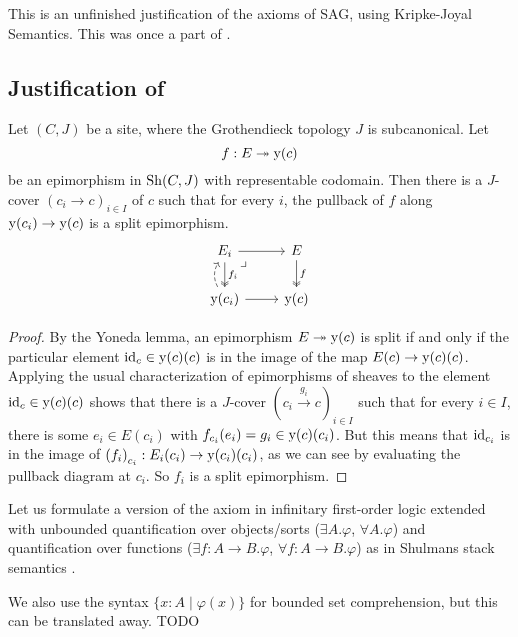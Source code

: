 This is an unfinished justification of the axioms of SAG,
using Kripke-Joyal Semantics. This was once a part of \cite{draft}.

\subsection{Justification of }

\begin{lemma}
  Let $(C, J)$ be a site,
  where the Grothendieck topology $J$ is subcanonical.
  Let
  \[ f : E \twoheadrightarrow \mathrm{y}(c) \]
  be an epimorphism in $\mathrm{Sh}(C, J)$ with representable codomain.
  Then there is a $J$-cover $(c_i \to c)_{i \in I}$ of $c$
  such that for every $i$,
  the pullback of $f$ along $\mathrm{y}(c_i) \to \mathrm{y}(c)$
  is a split epimorphism.
  \[ \begin{tikzcd}
    E_i \ar[r] \ar[d, two heads, "f_i"] \ar[dr, phantom, very near start, "\lrcorner"] &
    E \ar[d, two heads, "f"] \\
    \yo(c_i) \ar[r] \ar[u, bend left, dashed]&
    \yo(c)
  \end{tikzcd} \]
\end{lemma}

\begin{proof}
  By the Yoneda lemma,
  an epimorphism $E \twoheadrightarrow \mathrm{y}(c)$ is split
  if and only if
  the particular element $\mathrm{id}_c \in \mathrm{y}(c)(c)$
  is in the image of the map $E(c) \to \mathrm{y}(c)(c)$.
  Applying the usual characterization of epimorphisms of sheaves
  \cite[Corollary III.7.5]{maclane-moerdjik}
  to the element $\mathrm{id}_c \in \mathrm{y}(c)(c)$
  shows that there is a $J$-cover ${(c_i \xrightarrow{g_i} c)}_{i \in I}$
  such that for every $i \in I$,
  there is some $e_i \in E(c_i)$
  with $f_{c_i}(e_i) = g_i \in \mathrm{y}(c)(c_i)$.
  But this means that $\mathrm{id}_{c_i}$ is in the image of ${(f_i)}_{c_i} : E_i(c_i) \to \mathrm{y}(c_i)(c_i)$,
  as we can see by evaluating the pullback diagram at $c_i$.
  So $f_i$ is a split epimorphism.
\end{proof}

Let us formulate a version of the axiom 
in infinitary first-order logic extended with
unbounded quantification over objects/sorts
($\exists A. \varphi$, $\forall A. \varphi$)
and quantification over functions
($\exists f : A \to B. \varphi$, $\forall f : A \to B. \varphi$)
as in Shulmans stack semantics \cite[Section 7]{shulman-stack-semantics}.

We also use the syntax $\{x : A \mid \varphi(x)\}$
for bounded set comprehension,
but this can be translated away.
TODO

